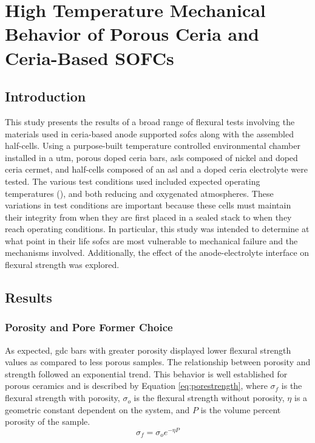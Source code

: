 
\chapter[High Temperature Mechanical Behavior of Porous Ceria and Ceria-Based Solid-Oxide Fuel Cells]{High Temperature Mechanical Behavior of Porous Ceria and Ceria-Based SOFCs}

\section{Introduction}
This study presents the results of a broad range of flexural tests involving the materials used in ceria-based anode supported \glspl{sofc} along with the assembled half-cells.
Using a purpose-built temperature controlled environmental chamber installed in a \gls{utm}, porous doped ceria bars, \glspl{asl} composed of nickel and doped ceria cermet, and half-cells composed of an \gls{asl} and a doped ceria electrolyte were tested.
The various test conditions used included expected operating temperatures (), and both reducing and oxygenated atmospheres.
These variations in test conditions are important because these cells must maintain their integrity from when they are first placed in a sealed stack to when they reach operating conditions.
In particular, this study was intended to determine at what point in their life \glspl{sofc} are most vulnerable to mechanical failure and the mechanisms involved.
Additionally, the effect of the anode-electrolyte interface on flexural strength was explored.

\section{Results}

\subsection{Porosity and Pore Former Choice}

As expected, \gls{gdc} bars with greater porosity displayed lower flexural strength values as compared to less porous samples.
The relationship between porosity and strength followed an exponential trend.
This behavior is well established for porous ceramics and is described by
Equation \ref{eq:porestrength}, where \(\sigma_{f}\) is the flexural strength with porosity,
\(\sigma_{o}\) is the flexural strength without porosity, \(\eta\) is a geometric constant dependent on the system, and \(P\) is the volume percent porosity of the sample.\cite{Rice1998}
\begin{equation}
    \sigma_f = \sigma_o e^{-\eta{}P}
    \label{eq:porestrength}
\end{equation}


